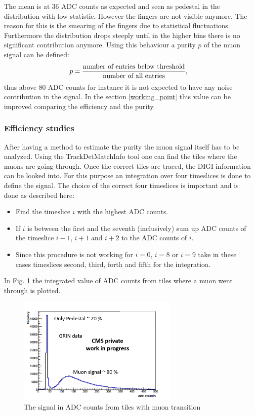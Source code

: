 			The mean is at 36 ADC counts as expected and seen as pedestal in the distribution with low statistic.
			However the fingers are not visible anymore.
			The reason for this is the smearing of the fingers due to statistical fluctuations.
			Furthermore the distribution drops steeply until in the higher bins there is no significant contribution anymore.
			Using this behaviour a purity $p$ of the muon signal can be defined:
			\begin{equation}
				p = \frac{\textnormal{number of entries below threshold}}{\textnormal{number of all entries}},
			\end{equation}
			thus above 80 ADC counts for instance it is not expected to have any noise contribution in the signal.
			In the section \ref{working_point} this value can be improved comparing the efficiency and the purity.
		\subsubsection{Efficiency studies}
			After having a method to estimate the purity the muon signal itself has to be analyzed.
			Using the TrackDetMatchInfo tool one can find the tiles where the muons are going through.
			Once the correct tiles are traced, the DIGI information can be looked into.
			For this purpose an integration over four timeslices is done to define the signal.
			The choice of the correct four timeslices is important and is done as described here:
			\begin{itemize}
			  \item Find the timeslice $i$ with the highest ADC counts.
			  \item If $i$ is between the first and the seventh (inclusively) sum up ADC counts of the timeslice $i-1$, $i+1$ and $i+2$ to the ADC counts of $i$.
			  \item Since this procedure is not working for $i=0$, $i=8$ or $i=9$ take in these cases timeslices second, third, forth and fifth for the integration.
			\end{itemize}
			In Fig. \ref{fig:efficiency1x1} the integrated value of ADC counts from tiles where a muon went through is plotted.
			\begin{figure}[htbp]
				\centering
				\includegraphics[width=0.70\textwidth]{Figures/erdogan/efficiency1x1.png}
				\caption{The signal in ADC counts from tiles with muon transition}
				\label{fig:efficiency1x1}
			\end{figure}
